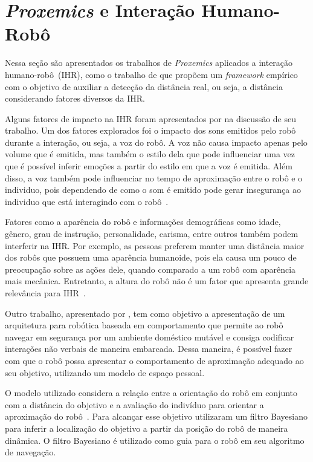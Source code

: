 \section{\emph{Proxemics} e Interação Humano-Robô}
\label{sec:proxemicsihr}
Nessa seção são apresentados os trabalhos de \emph{Proxemics} aplicados a interação humano-robô~(IHR), como o trabalho de  que propõem um \emph{framework} empírico com o objetivo de auxiliar a detecção da distância real, ou seja, a distância considerando fatores diversos da IHR.

Alguns fatores de impacto na IHR foram apresentados por  na discussão de seu trabalho. Um dos fatores explorados foi o impacto dos sons emitidos pelo robô durante a interação, ou seja, a voz do robô. A voz não causa impacto apenas pelo volume que é emitida, mas também o estilo dela que pode influenciar uma vez que é possível inferir emoções a partir do estilo em que a voz é emitida. Além disso, a voz também pode influenciar no tempo de aproximação entre o robô e o individuo, pois dependendo de como o som é emitido pode gerar insegurança ao individuo que está interagindo com o robô~\cite{walters:2009}.

Fatores como a aparência do robô e informações demográficas como idade, gênero, grau de instrução, personalidade, carisma, entre outros também podem interferir na IHR. Por exemplo, as pessoas preferem manter uma distância maior dos robôs que possuem uma aparência humanoide, pois ela causa um pouco de preocupação sobre as ações dele, quando comparado a um robô com aparência mais mecânica. Entretanto, a altura do robô não é um fator que apresenta grande relevância para IHR~\cite{walters:2009}.

Outro trabalho, apresentado por , tem como objetivo a apresentação de um arquitetura para robótica baseada em comportamento que permite ao robô navegar em segurança por um ambiente doméstico mutável e consiga codificar interações não verbais de maneira embarcada. Dessa maneira, é possível fazer com que o robô possa apresentar o comportamento de aproximação adequado ao seu objetivo, utilizando um modelo de espaço pessoal.

O modelo utilizado considera a relação entre a orientação do robô em conjunto com a distância do objetivo e a avaliação do indivíduo para orientar a aproximação do robô~\cite{torta:2011}. Para alcançar esse objetivo  utilizaram um filtro Bayesiano para inferir a localização do objetivo a partir da posição do robô de maneira dinâmica. O filtro Bayesiano é utilizado como guia para o robô em seu algoritmo de navegação.

